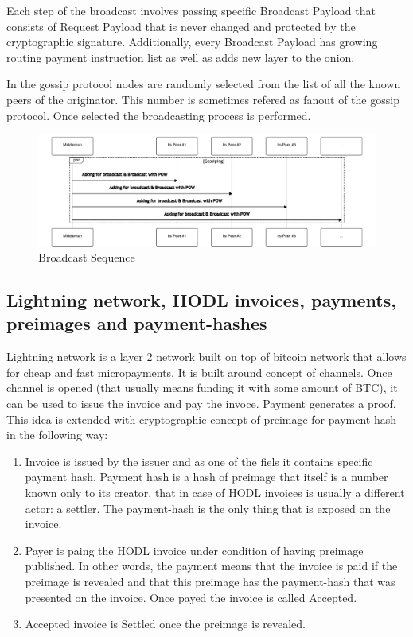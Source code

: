 \documentclass{article}
\begin{document}
Each step of the broadcast involves passing specific Broadcast Payload that consists of Request Payload that is never changed and protected by the cryptographic signature.  Additionally, every Broadcast Payload has growing routing payment instruction list as well as adds new layer to the onion.

In the gossip protocol nodes are randomly selected from the list of all the known peers of the originator. This number is sometimes refered as fanout \cite{Fanout} of the gossip protocol. Once selected the broadcasting process is performed.

\begin{figure}
	\centering
	\includegraphics[scale=0.5]{BroadcastSequence.pdf}
	\caption{Broadcast Sequence}
	\label{fig:fr:broadcastsequence}
\end{figure}

\subsection{Lightning network, HODL invoices, payments, preimages and payment-hashes}

Lightning network is a layer 2 network built on top of bitcoin network that allows for cheap and fast micropayments.
It is built around concept of channels. Once channel is opened (that usually means funding it with some amount of BTC), it can be used to issue the invoice and pay the invoce. Payment generates a proof. This idea is extended with cryptographic concept of preimage for payment hash in the following way:
\begin{enumerate}
	\item Invoice is issued by the issuer and as one of the fiels it contains specific payment hash. Payment hash is a hash of preimage that itself is a number known only to its creator, that in case of HODL invoices is usually a different actor: a settler. The payment-hash is the only thing that is exposed on the invoice.
	\item Payer is paing the HODL invoice under condition of having preimage published. In other words, the payment means that the invoice is paid if the preimage is revealed and that this preimage has the payment-hash that was presented on the invoice. Once payed the invoice is called Accepted.
	\item Accepted invoice is Settled once the preimage is revealed.
\end{enumerate}
\end{document}
